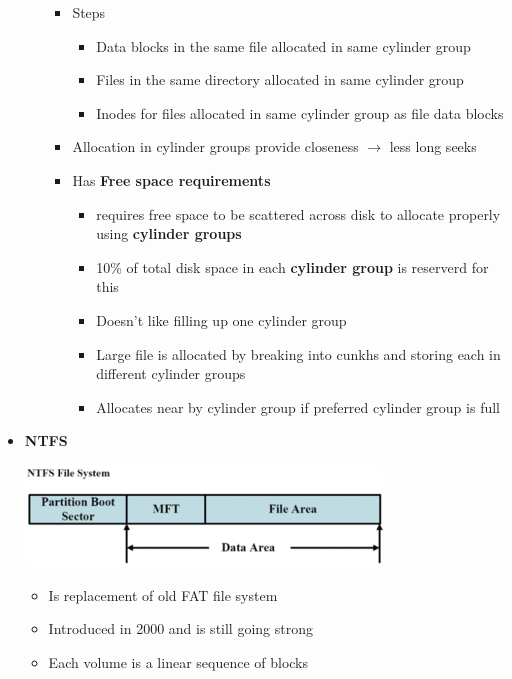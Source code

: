 \documentclass[12pt]{article}
\begin{document}
\begin{itemize}
\begin{itemize}
        \begin{itemize}
            \item Steps
            \begin{itemize}
                \item Data blocks in the same file allocated in same cylinder group
                \item Files in the same directory allocated in same cylinder group
                \item Inodes for files allocated in same cylinder group as file data blocks
            \end{itemize}
            \item Allocation in cylinder groups provide closeness $\to$ less long seeks
            \item Has \textbf{Free space requirements}
            \begin{itemize}
                \item requires free space to be scattered across disk to allocate properly using \textbf{cylinder groups}
                \item 10\% of total disk space in each \textbf{cylinder group} is reserverd for this
                \item Doesn't like filling up one cylinder group
                \item Large file is allocated by breaking into cunkhs and storing each in different cylinder groups
                \item Allocates near by cylinder group if preferred cylinder group is full
            \end{itemize}
        \end{itemize}
    \end{itemize}

    \item \textbf{NTFS}

    \begin{center}
    \includegraphics[width=0.6\linewidth]{images/notes_9.png}
    \end{center}

    \begin{itemize}
        \item Is replacement of old FAT file system
        \item Introduced in 2000 and is still going strong
        \item Each volume is a linear sequence of blocks
    \end{itemize}
\end{itemize}
\end{document}
